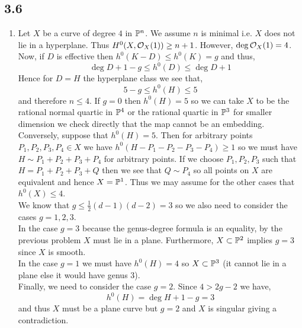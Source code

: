 \documentclass[12pt]{article}
\begin{document}
\subsection{3.6}

\begin{enumerate}
\item Let $X$ be a curve of degree $4$ in $\P^n$. We assume $n$ is minimal i.e. $X$ does not lie in a hyperplane. Thus $H^0(X, \struct{X}(1)) \ge n+1$. However, $\deg{\struct{X}(1)} = 4$. Now, if $D$ is effective then $h^0(K-D) \le h^0(K) = g$ and thus,
\[ \deg{D} + 1 - g \le h^0(D) \le \deg{D} + 1 \]
Hence for $D = H$ the hyperplane class we see that,
\[ 5 - g \le h^0(H) \le 5 \]
and therefore $n \le 4$. If $g = 0$ then $h^0(H) = 5$ so we can take $X$ to be the rational normal quartic in $\P^4$ or the rational quartic in $\P^3$ for smaller dimension we check directly that the map cannot be an embedding.
\bigskip\\
Conversely, suppose that $h^0(H) = 5$. Then for arbitrary points $P_1, P_2, P_3, P_4 \in X$ we have $h^0(H - P_1 - P_2 - P_3 - P_4) \ge 1$ so we must have $H \sim P_1 + P_2 + P_3 + P_4$ for arbitrary points. If we choose $P_1, P_2, P_3$ such that $H = P_1 + P_2 + P_3 + Q$ then we see that $Q \sim P_4$ so all points on $X$ are equivalent and hence $X = \P^1$. Thus we may assume for the other cases that $h^0(X) \le 4$. 
\bigskip\\
We know that $g \le \frac{1}{2}(d - 1)(d - 2) = 3$ so we also need to consider the cases $g = 1,2,3$. 
\bigskip\\
In the case $g = 3$ because the genus-degree formula is an equality, by the previous problem $X$ must lie in a plane. Furthermore, $X \subset \P^2$ implies $g = 3$ since $X$ is smooth. 
\bigskip\\
In the case $g = 1$ we must have $h^0(H) = 4$ so $X \subset \P^3$ (it cannot lie in a plane else it would have genus $3$). 
\bigskip\\
Finally, we need to consider the case $g = 2$. Since $4 > 2 g - 2$ we have,
\[ h^0(H) = \deg{H} + 1 - g = 3 \]
and thus $X$ must be a plane curve but $g = 2$ and $X$ is singular giving a contradiction. 


\end{enumerate}
\end{document}
